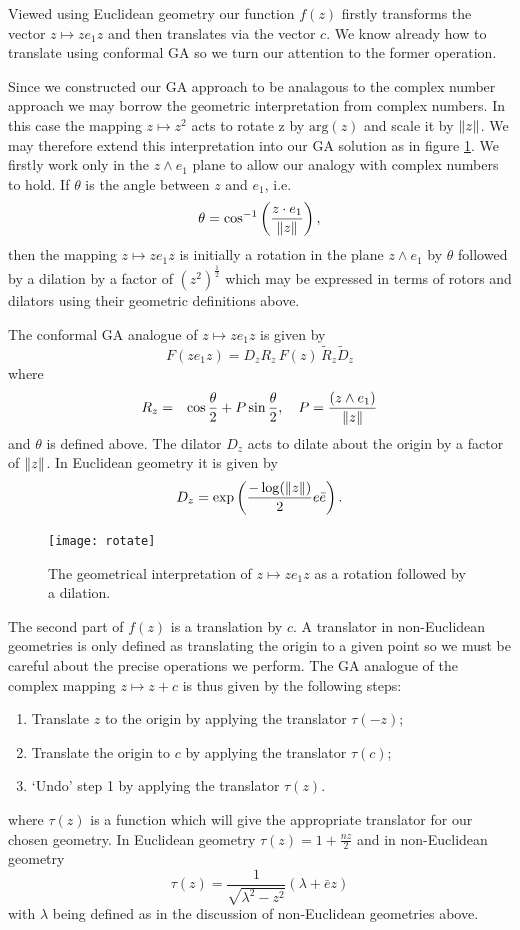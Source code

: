 Viewed using Euclidean geometry our function $f(z)$ firstly transforms the vector
$z \mapsto ze_1z$ and then translates via the vector $c$. We know already how to translate
using conformal GA so we turn our attention to the former operation.

Since we constructed our GA approach to be analagous to the complex number approach we
may borrow the geometric interpretation from complex numbers. In this case the mapping 
$z \mapsto z^2$ acts to rotate z by $\mathrm{arg}(z)$ and scale it by
$\left\Vert z \right\Vert$. We may therefore extend this interpretation into our GA solution as in
figure \ref{fig:rotate}. We firstly work only in the $z \wedge e_1$ plane to allow
our analogy with complex numbers to hold. If $\theta$ is the angle between $z$ and
$e_1$, i.e.
\[
\theta = \cos^{-1}\left(\frac{z \cdot e_1}{\left\Vert z \right\Vert}\right),
\] 
then the mapping $z \mapsto ze_1z$ is initially a rotation in the plane $z \wedge e_1$
by $\theta$ followed by a dilation by a factor of $(z^2)^\frac{1}{2}$ 
which may be expressed in terms of rotors and dilators using their geometric
definitions above.

\begin{definition}
The conformal GA analogue of $z \mapsto ze_1z$ is given by
\[
F(ze_1z) = D_z R_z\,F(z)\,\tilde{R}_z \tilde{D}_z
\]
where
\begin{eqnarray*}
R_z & = & \cos \frac{\theta}{2} + P \sin \frac{\theta}{2},
    \quad
P = \frac{(z \wedge e_1)}{\left\Vert z \right\Vert}
\end{eqnarray*}
and $\theta$ is defined above.
The dilator $D_z$ acts to dilate about the origin by a factor of
$\left\Vert z \right\Vert$. In Euclidean geometry it is given by
\[
D_z = \exp\left( \frac{-\log(\left\Vert z \right\Vert)}{2} e\bar{e} \right).
\]
\end{definition}

\begin{figure}
\centering
\texttt{[image: rotate]}
\caption{\label{fig:rotate}%
  The geometrical interpretation of $z \mapsto ze_1z$ as a rotation followed by a dilation.
}
\end{figure}

The second part of $f(z)$ is a translation by $c$. A translator in non-Euclidean
geometries is only defined as translating the origin to a given point so we must be
careful about the precise operations we perform. The GA analogue of the
complex mapping $z \mapsto z + c$ is thus given by the following steps:
\begin{enumerate}
\item Translate $z$ to the origin by applying the translator $\tau(-z)$;
\item Translate the origin to $c$ by applying the translator $\tau(c)$;
\item `Undo' step 1 by applying the translator $\tau(z)$.
\end{enumerate}
where $\tau(z)$ is a function which will give the appropriate translator for our 
chosen geometry. In Euclidean geometry $\tau(z) = 1 + \frac{nz}{2}$ and in
non-Euclidean geometry
\[
\tau(z) = \frac{1}{\sqrt{\lambda^2 - z^2}}(\lambda + \bar{e}z)
\]
with $\lambda$ being defined as in the discussion of non-Euclidean geometries above.


